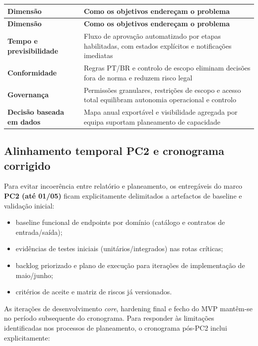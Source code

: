 \documentclass[11pt,a4paper,twoside]{article}
\newcommand{\tH}[1]{\textbf{\sffamily\small\color{white}#1}}
\newcommand{\theadrow}{\rowcolor{ACCENT}}
\begin{document}
\begin{longtable}{>{\small\bfseries}p{3.8cm} >{\small}p{10.4cm}}
\theadrow
\tH{Dimensão} & \tH{Como os objetivos endereçam o problema} \\
\midrule
\endfirsthead
\theadrow
\tH{Dimensão} & \tH{Como os objetivos endereçam o problema} \\
\midrule
\endhead
Tempo e previsibilidade & Fluxo de aprovação automatizado por etapas habilitadas, com estados explícitos e notificações imediatas \\
Conformidade & Regras PT/BR e controlo de escopo eliminam decisões fora de norma e reduzem risco legal \\
Governança & Permissões granulares, restrições de escopo e acesso total equilibram autonomia operacional e controlo \\
Decisão baseada em dados & Mapa anual exportável e visibilidade agregada por equipa suportam planeamento de capacidade \\
\bottomrule
\end{longtable}

\subsection{Alinhamento temporal PC2 e cronograma corrigido}

Para evitar incoerência entre relatório e planeamento, os entregáveis do marco \textbf{PC2 (até 01/05)} ficam explicitamente delimitados a artefactos de baseline e validação inicial:

\begin{itemize}
  \item baseline funcional de endpoints por domínio (catálogo e contratos de entrada/saída);
  \item evidências de testes iniciais (unitários/integrados) nas rotas críticas;
  \item backlog priorizado e plano de execução para iterações de implementação de maio/junho;
  \item critérios de aceite e matriz de riscos já versionados.
\end{itemize}

As iterações de desenvolvimento \textit{core}, hardening final e fecho do MVP mantêm-se no período subsequente do cronograma. Para responder às limitações identificadas nos processos de planeamento, o cronograma pós-PC2 inclui explicitamente:
\end{document}

